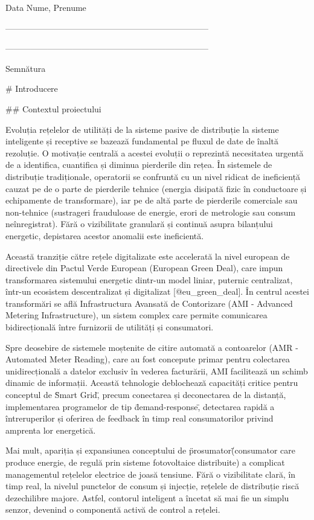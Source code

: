 Data Nume, Prenume

------------------------------------------------------------------------

------------------------------------------------------------------------

Semnătura

# Introducere

## Contextul proiectului

Evoluția rețelelor de utilități de la sisteme pasive de distribuție la
sisteme inteligente și receptive se bazează fundamental pe fluxul de
date de înaltă rezoluție. O motivație centrală a acestei evoluții o
reprezintă necesitatea urgentă de a identifica, cuantifica și diminua
pierderile din rețea. În sistemele de distribuție tradiționale,
operatorii se confruntă cu un nivel ridicat de ineficiență cauzat pe de
o parte de pierderile tehnice (energia disipată fizic în conductoare și
echipamente de transformare), iar pe de altă parte de pierderile
comerciale sau non-tehnice (sustrageri frauduloase de energie, erori de
metrologie sau consum neînregistrat). Fără o vizibilitate granulară și
continuă asupra bilanțului energetic, depistarea acestor anomalii este
ineficientă.

Această tranziție către rețele digitalizate este accelerată la nivel
european de directivele din Pactul Verde European (European Green Deal),
care impun transformarea sistemului energetic dintr-un model liniar,
puternic centralizat, într-un ecosistem descentralizat și digitalizat
[@eu_green_deal]. În centrul acestei transformări se află Infrastructura
Avansată de Contorizare (AMI - Advanced Metering Infrastructure), un
sistem complex care permite comunicarea bidirecțională între furnizorii
de utilități și consumatori.

Spre deosebire de sistemele moștenite de citire automată a contoarelor
(AMR - Automated Meter Reading), care au fost concepute primar pentru
colectarea unidirecțională a datelor exclusiv în vederea facturării, AMI
facilitează un schimb dinamic de informații. Această tehnologie
deblochează capacități critice pentru conceptul de \"Smart Grid\",
precum conectarea și deconectarea de la distanță, implementarea
programelor de tip \"demand-response\", detectarea rapidă a
întreruperilor și oferirea de feedback în timp real consumatorilor
privind amprenta lor energetică.

Mai mult, apariția și expansiunea conceptului de \"prosumator\"
(consumator care produce energie, de regulă prin sisteme fotovoltaice
distribuite) a complicat managementul rețelelor electrice de joasă
tensiune. Fără o vizibilitate clară, în timp real, la nivelul punctelor
de consum și injecție, rețelele de distribuție riscă dezechilibre
majore. Astfel, contorul inteligent a încetat să mai fie un simplu
senzor, devenind o componentă activă de control a rețelei.


